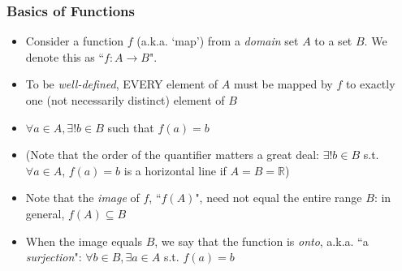 \begin{frame}
\frametitle{Basics of Functions}

\begin{itemize}[<+->]

\item Consider a function $f$ (a.k.a. `map') from a \emph{domain} set $A$ to a  set $B$. We denote this as ``$f: A \rightarrow B$". 

\item To be \emph{well-defined}, EVERY element of $A$ must be mapped by $f$ to exactly one (not necessarily distinct) element of $B$

\item[] $\forall a \in A, \exists ! b \in B$ such that $f(a) = b$

\item[] (Note that the order of the quantifier matters a great deal: $\exists ! b \in B$ s.t. $\forall a \in A$,  $f(a) = b$ is a horizontal line if $A = B = \mathbb{R}$)

\item Note that the \emph{image} of $f$, ``$f(A)$", need not equal the entire range $B$: in general, $f(A) \subseteq B$

\item When the image equals $B$, we say that the function is \emph{onto}, a.k.a. ``a \emph{surjection}": $\forall b \in B, \exists a \in A$ s.t. $f(a) = b$

\end{itemize}
\end{frame}

